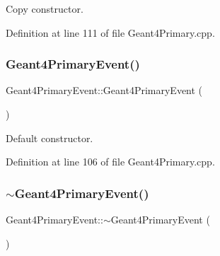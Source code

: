 Copy constructor. 



Definition at line 111 of file Geant4\+Primary.\+cpp.

\hypertarget{class_d_d4hep_1_1_simulation_1_1_geant4_primary_event_aa17acb393dfaa92967d7f3f7779807cf}{}\label{class_d_d4hep_1_1_simulation_1_1_geant4_primary_event_aa17acb393dfaa92967d7f3f7779807cf} 
\subsubsection{\texorpdfstring{Geant4\+Primary\+Event()}{Geant4PrimaryEvent()}\hspace{0.1cm}{\footnotesize\ttfamily [2/2]}}
{\footnotesize\ttfamily Geant4\+Primary\+Event\+::\+Geant4\+Primary\+Event (\begin{DoxyParamCaption}{ }\end{DoxyParamCaption})}



Default constructor. 



Definition at line 106 of file Geant4\+Primary.\+cpp.

\hypertarget{class_d_d4hep_1_1_simulation_1_1_geant4_primary_event_ab4ddee2fb079f7b48eaabd24cbe8b021}{}\label{class_d_d4hep_1_1_simulation_1_1_geant4_primary_event_ab4ddee2fb079f7b48eaabd24cbe8b021} 
\subsubsection{\texorpdfstring{$\sim$\+Geant4\+Primary\+Event()}{~Geant4PrimaryEvent()}}
{\footnotesize\ttfamily Geant4\+Primary\+Event\+::$\sim$\+Geant4\+Primary\+Event (\begin{DoxyParamCaption}{ }\end{DoxyParamCaption})\hspace{0.3cm}{\ttfamily [virtual]}}



